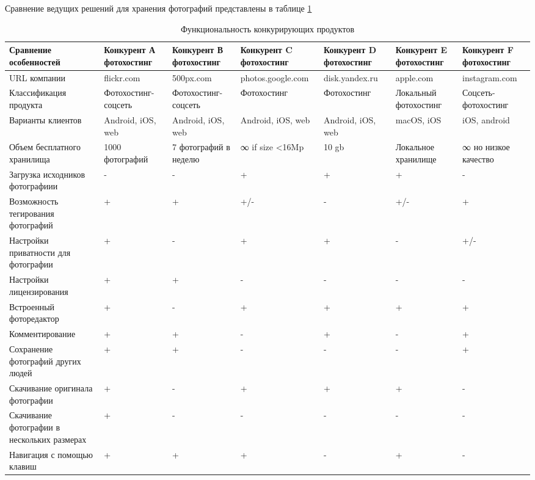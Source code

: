 Сравнение ведущих решений для хранения фотографий представлены в таблице \ref{comp-table}

\begin{landscape}
\begin{table}[H]
  \caption{Функциональность конкурирующих продуктов}\label{comp-table}
  \smalltable
  \begin{tabular}{|p{5.8cm}|p{2.8cm}|p{2.8cm}|p{2.8cm}|p{2.8cm}|p{2.8cm}|p{2.8cm}|} %
  \hline Сравнение особенностей & Конкурент А фотохостинг & Конкурент В фотохостинг & Конкурент C фотохостинг & Конкурент D фотохостинг & Конкурент E фотохостинг & Конкурент F фотохостинг \\ 
  \hline URL компании & flickr.com & 500px.com & photos.google.com & disk.yandex.ru & apple.com & instagram.com \\ 
  \hline Классификация продукта & Фотохостинг-соцсеть & Фотохостинг-соцсеть & Фотохостинг & Фотохостинг & Локальный фотохостинг & Соцсеть-фотохостинг \\ 
  \hline Варианты клиентов & Android, iOS, web & Android, iOS, web & Android, iOS, web & Android, iOS, web & macOS, iOS & iOS, android \\ 
  \hline Объем бесплатного хранилища & 1000 фотографий & 7 фотографий в неделю & ∞ if size <16Mp & 10 gb & Локальное хранилище & ∞ но низкое качество \\ 
  \hline Загрузка исходников фотографиии & - & - & + & + & + & - \\ 
  \hline Возможность тегирования фотографий & + & + & +/- & - & +/- & + \\ 
  \hline Настройки приватности для фотографии & + & - & + & + & - & +/- \\ 
  \hline Настройки лицензирования & + & + & - & - & - & - \\ 
  \hline Встроенный фоторедактор & + & - & + & + & + & + \\ 
  \hline Комментирование & + & + & - & + & - & + \\ 
  \hline Сохранение фотографий других людей & + & + & - & - & - & + \\ 
  \hline Скачивание оригинала фотографии & + & - & + & + & + & - \\ 
  \hline Скачивание фотографии в нескольких размерах & + & - & - & - & - & - \\ 
  \hline Навигация с помощью клавиш & + & + & + & - & + & - \\ 

\end{tabular}
\end{table}
\end{landscape}
